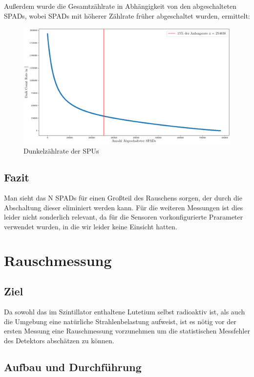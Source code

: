 \documentclass[12pt,twoside,a4paper]{scrartcl}
\begin{document}
			Außerdem wurde die Gesamtzählrate in Abhängigkeit von den abgeschalteten SPADs, wobei SPADs mit höherer Zählrate früher abgeschaltet wurden, ermittelt:

			\begin{figure}[H]
				\centering
				\includegraphics[width = 0.9 \textwidth]{Plots/DCM/DCR_vs_N.png}
				\caption{Dunkelzählrate der SPUs}
			\end{figure}

		\subsection{Fazit}

		Man sieht das N SPADs für einen Großteil des Rauschens sorgen, der durch die Abschaltung dieser eliminiert werden kann. Für die weiteren Messungen ist dies leider nicht sonderlich relevant, da für die Sensoren vorkonfigurierte Prarameter verwendet wurden, in die wir leider keine Einsicht hatten.

	\section{Rauschmessung}

	\subsection{Ziel}

		Da sowohl das im Szintillator enthaltene Lutetium selbst radioaktiv ist, als auch die Umgebung eine natürliche Strahlenbelastung aufweist, ist es nötig vor der ersten Messung eine Rauschmessung vorzunehmen um die statistischen Messfehler des Detektors abschätzen zu können.

	\subsection{Aufbau und Durchführung}
\end{document}

